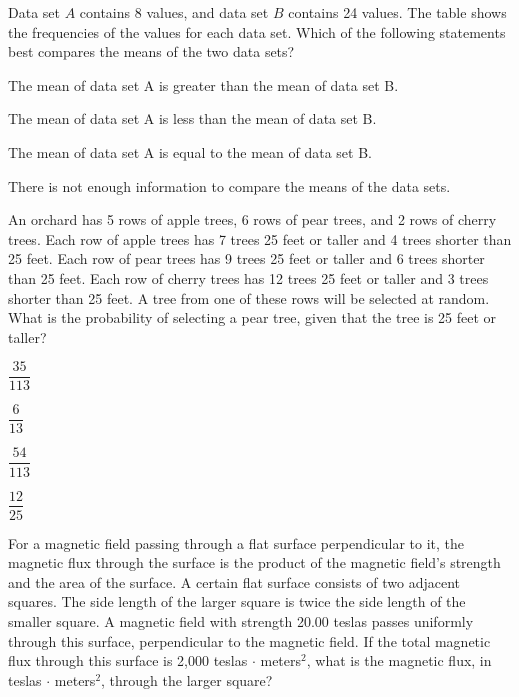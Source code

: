 \vfill
\clearpage
\noindent\begin{minipage}{\linewidth}
\par\smallskip
Data set $A$ contains 8 values, and data set $B$ contains 24 values. The table shows the frequencies of the values for each data set. Which of the following statements best compares the means of the two data sets?
\satfig{\figtblfreqab}
\begin{satchoices}
  \item[A)] The mean of data set A is greater than the mean of data set B.
  \item[B)] The mean of data set A is less than the mean of data set B.
  \item[C)] The mean of data set A is equal to the mean of data set B.
  \item[D)] There is not enough information to compare the means of the data sets.
\end{satchoices}
\end{minipage}
\vfill
\noindent\begin{minipage}{\linewidth}
\par\smallskip
An orchard has 5 rows of apple trees, 6 rows of pear trees, and 2 rows of cherry trees. Each row of apple trees has 7 trees 25 feet or taller and 4 trees shorter than 25 feet. Each row of pear trees has 9 trees 25 feet or taller and 6 trees shorter than 25 feet. Each row of cherry trees has 12 trees 25 feet or taller and 3 trees shorter than 25 feet. A tree from one of these rows will be selected at random. What is the probability of selecting a pear tree, given that the tree is 25 feet or taller?
\begin{satchoices}
  \item[A)] $\dfrac{35}{113}$
  \item[B)] $\dfrac{6}{13}$
  \item[C)] $\dfrac{54}{113}$
  \item[D)] $\dfrac{12}{25}$
\end{satchoices}
\end{minipage}
\vfill
\noindent\begin{minipage}{\linewidth}
\par\smallskip
For a magnetic field passing through a flat surface perpendicular to it, the magnetic flux through the surface is the product of the magnetic field's strength and the area of the surface. A certain flat surface consists of two adjacent squares. The side length of the larger square is twice the side length of the smaller square. A magnetic field with strength 20.00 teslas passes uniformly through this surface, perpendicular to the magnetic field. If the total magnetic flux through this surface is 2,000 teslas $\cdot$ meters$^2$, what is the magnetic flux, in teslas $\cdot$ meters$^2$, through the larger square?
\end{minipage}
